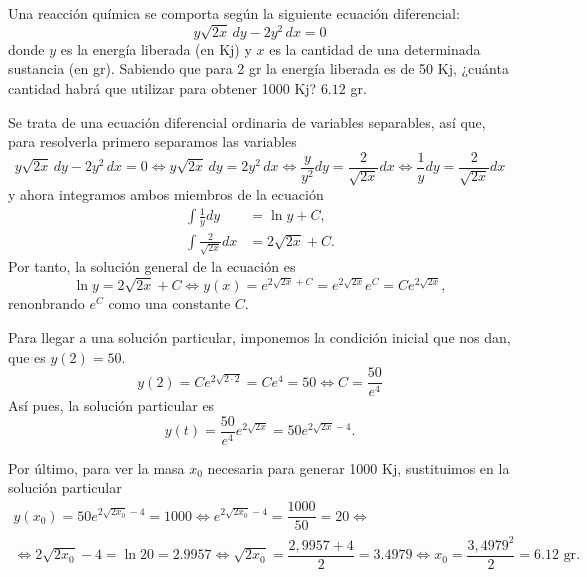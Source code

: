 {Una reacción química se comporta según la siguiente ecuación diferencial:
\[
y\sqrt {2x} \,dy - 2y^2 \,dx = 0
\]
donde $y$ es la energía liberada (en Kj) y $x$ es la cantidad de una determinada sustancia (en gr). Sabiendo que para 2
gr la energía liberada es de 50 Kj, ¿cuánta cantidad habrá que utilizar para obtener 1000 Kj?}
{$6.12$  gr.
}
{Se trata de una ecuación diferencial ordinaria de variables separables, así que, para resolverla primero separamos las variables
\[
y\sqrt {2x} \,dy - 2y^2 \,dx = 0
\Leftrightarrow
y\sqrt {2x} \,dy =  2y^2 \,dx
\Leftrightarrow
\frac{y}{y^2}dy =  \frac{2}{\sqrt{2x}}dx
\Leftrightarrow
\frac{1}{y}dy =  \frac{2}{\sqrt{2x}}dx
\]
y ahora integramos ambos miembros de la ecuación
\begin{align*}
\int \frac{1}{y}dy &= \ln y +C, \\
\int \frac{2}{\sqrt{2x}}dx &= 2\sqrt{2x}+C.
\end{align*}
Por tanto, la solución general de la ecuación es
\[
\ln y = 2\sqrt{2x}+C
\Leftrightarrow
y(x) = e^{2\sqrt{2x}+C} = e^{2\sqrt{2x}}e^C = C e^{2\sqrt{2x}},
\]
renonbrando $e^C$ como una constante $C$.

Para llegar a una solución particular, imponemos la condición inicial que nos dan, que es $y(2)=50$.
\[
y(2) = C e^{2\sqrt{2\cdot 2}} = C e^4 = 50
\Leftrightarrow
C = \frac{50}{e^4}
\]
Así pues, la solución particular es
\[
y(t) = \frac{50}{e^4} e^{2\sqrt{2x}} = 50  e^{2\sqrt{2x}-4}.
\]

Por último, para ver la masa $x_0$ necesaria para generar 1000 Kj, sustituimos en la solución particular
\[
\renewcommand{\arraystretch}{2}
\begin{array}{c}
y(x_0) = 50  e^{2\sqrt{2x_0}-4} = 1000
\Leftrightarrow
e^{2\sqrt{2x_0}-4} = 	\dfrac{1000}{50} = 20
\Leftrightarrow \\
\Leftrightarrow
2\sqrt{2x_0}-4 = 	\ln 20 = 2.9957
\Leftrightarrow
\sqrt{2x_0} = \dfrac{2,9957+4}{2} = 3.4979
\Leftrightarrow
x_0 = \dfrac{3,4979 ^2}{2} = 6.12 \mbox{ gr}.
\end{array}
\]
}


